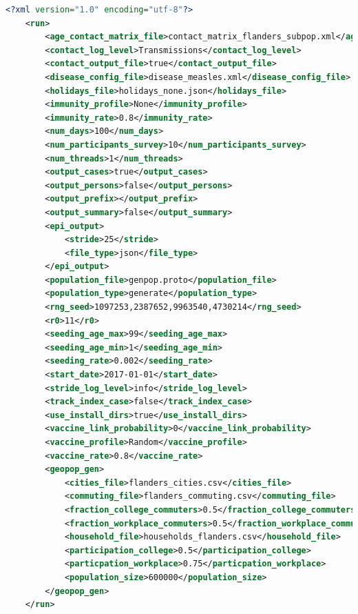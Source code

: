 \begin{center}
	\begin{lstlisting}[language=XML,caption=Config xml file example to make epi-output.]
	<?xml version="1.0" encoding="utf-8"?>
	<run>
		<age_contact_matrix_file>contact_matrix_flanders_subpop.xml</age_contact_matrix_file>
		<contact_log_level>Transmissions</contact_log_level>
		<contact_output_file>true</contact_output_file>
		<disease_config_file>disease_measles.xml</disease_config_file>
		<holidays_file>holidays_none.json</holidays_file>
		<immunity_profile>None</immunity_profile>
		<immunity_rate>0.8</immunity_rate>
		<num_days>100</num_days>
		<num_participants_survey>10</num_participants_survey>
		<num_threads>1</num_threads>
		<output_cases>true</output_cases>
		<output_persons>false</output_persons>
		<output_prefix></output_prefix>
		<output_summary>false</output_summary>
		<epi_output>
		    <stride>25</stride>
		    <file_type>json</file_type>
		</epi_output>
		<population_file>genpop.proto</population_file>
		<population_type>generate</population_type>
		<rng_seed>1097253,2387652,9963540,4730214</rng_seed>
		<r0>11</r0>
		<seeding_age_max>99</seeding_age_max>
		<seeding_age_min>1</seeding_age_min>
		<seeding_rate>0.002</seeding_rate>
		<start_date>2017-01-01</start_date>
		<stride_log_level>info</stride_log_level>
		<track_index_case>false</track_index_case>
		<use_install_dirs>true</use_install_dirs>
		<vaccine_link_probability>0</vaccine_link_probability>
		<vaccine_profile>Random</vaccine_profile>
		<vaccine_rate>0.8</vaccine_rate>
		<geopop_gen>
		    <cities_file>flanders_cities.csv</cities_file>
			<commuting_file>flanders_commuting.csv</commuting_file>
			<fraction_college_commuters>0.5</fraction_college_commuters>
			<fraction_workplace_commuters>0.5</fraction_workplace_commuters>
			<household_file>households_flanders.csv</household_file>
			<participation_college>0.5</participation_college>
			<particpation_workplace>0.75</particpation_workplace>
			<population_size>600000</population_size>
		</geopop_gen>
	</run>
	\end{lstlisting}
\end{center}



